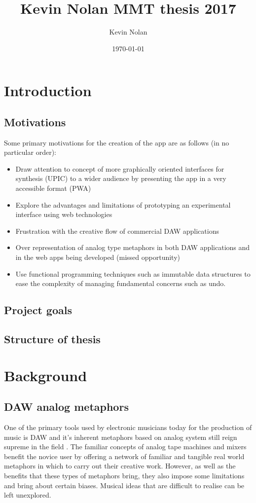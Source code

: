 \documentclass[a4paper,12pt]{article}
\author{Kevin Nolan}
\date{\today}
\title{Kevin Nolan MMT thesis 2017}
\begin{document}
\maketitle
\setcounter{tocdepth}{4}
\tableofcontents


\section{Introduction}
\label{sec:org5fe1151}
\subsection{Motivations}
\label{sec:org0142afd}
Some primary motivations for the creation of the app are as follows (in no
particular order):
\begin{itemize}
\item Draw attention to concept of more graphically oriented interfaces for
synthesis (UPIC) to a wider audience by presenting the app in a very
accessible format (PWA)
\item Explore the advantages and limitations of prototyping an experimental
interface using web technologies
\item Frustration with the creative flow of commercial DAW applications
\item Over representation of analog type metaphors in both DAW applications and in
the web apps being developed (missed opportunity)
\item Use functional programming techniques such as immutable data structures to
ease the complexity of managing fundamental concerns such as undo.
\end{itemize}

\subsection{Project goals}
\label{sec:org1365b04}
\subsection{Structure of thesis}
\label{sec:org6bf5f0a}

\section{Background}
\label{sec:org5621eb2}

\subsection{DAW analog metaphors}
\label{sec:org46946c1}
One of the primary tools used by electronic musicians today for the production
of music is DAW and it's inherent metaphors based on analog system still reign
supreme in the field \cite{bell_journal_2015}. The familiar concepts of analog
tape machines and mixers benefit the novice user by offering a network of
familiar and tangible real world metaphors in which to carry out their creative
work. However, as well as the benefits that these types of metaphors bring, they
also impose some limitations and bring about certain biases. Musical ideas that
are difficult to realise can be left unexplored.
\end{document}
